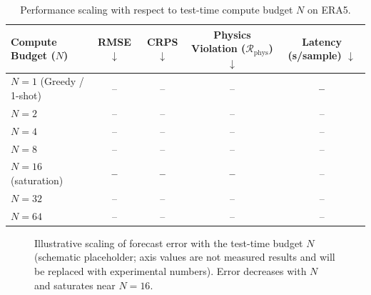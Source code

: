 \documentclass[preprint,12pt]{elsarticle}
\begin{document}
\begin{table}[H]
\centering
\small
\caption{Performance scaling with respect to test-time compute budget $N$ on ERA5.}
\label{tab:ablation_compute}
\begin{tabular}{lcccc}
\toprule
Compute Budget ($N$) & RMSE $\downarrow$ & CRPS $\downarrow$ & Physics Violation ($\mathcal{R}_{\text{phys}}$) $\downarrow$ & Latency (s/sample) $\downarrow$ \\
\midrule
$N=1$ (Greedy / 1-shot) & -- & -- & -- & \textbf{--} \\
$N=2$                  & -- & -- & -- & -- \\
$N=4$                  & -- & -- & -- & -- \\
$N=8$                  & -- & -- & -- & -- \\
$N=16$ (saturation)    & \textbf{--} & \textbf{--} & \textbf{--} & -- \\
$N=32$                 & -- & -- & -- & -- \\
$N=64$                 & -- & -- & -- & -- \\
\bottomrule
\end{tabular}
\end{table}

\begin{figure}[t]
\centering
{}
\caption{Illustrative scaling of forecast error with the test-time budget $N$ (schematic placeholder; axis values are not measured results and will be replaced with experimental numbers). Error decreases with $N$ and saturates near $N=16$.}
\label{fig:scaling}
\end{figure}
\end{document}
